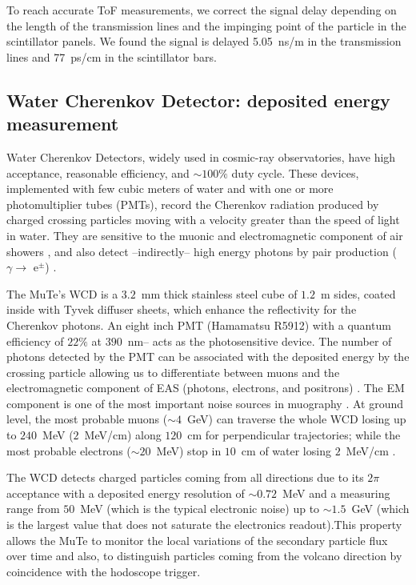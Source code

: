 \documentclass[letterpaper,11pt]{article}
\begin{document}
To reach accurate ToF measurements, we correct the signal delay depending on the length of the transmission lines and the impinging point of the particle in the scintillator panels. We found the signal is delayed 5.05~ns/m in the transmission lines and 77~ps/cm in the scintillator bars.

\subsection{Water Cherenkov Detector: deposited energy measurement}

Water Cherenkov Detectors, widely used in cosmic-ray observatories, have high acceptance, reasonable efficiency, and $\sim 100\%$ duty cycle. These devices, implemented with few cubic meters of water and with one or more photomultiplier tubes (PMTs), record the Cherenkov radiation produced by charged crossing particles moving with a velocity greater than the speed of light in water. They are sensitive to the muonic and electromagnetic component of air showers \cite{Auger2015}, and also detect --indirectly-- high energy photons by pair production ($\gamma \rightarrow$ e$^{\pm}$) \cite{allard2007detecting, allard2008use, allekotte2008surface}. 

The MuTe's WCD is a $3.2$~mm thick stainless steel cube of $1.2$~m sides, coated inside with Tyvek diffuser sheets, which enhance the reflectivity for the Cherenkov photons. An eight inch PMT (Hamamatsu R5912) with a quantum efficiency of $22\%$ at $390$~nm-- acts as the photosensitive device. The number of photons detected by the PMT can be associated with the deposited energy by the crossing particle allowing us to differentiate between muons and the electromagnetic component of EAS (photons, electrons, and positrons) \cite{Billoir2014}. The EM component is one of the most important noise sources in muography \cite{KUSAGAYA2015, Nishiyama2014Noise, Marteau2012Noise}. At ground level, the most probable muons ($\sim 4$~GeV) can traverse the whole WCD losing up to $240$~MeV ($2$~MeV/cm) along $120$~cm for perpendicular trajectories; while the most probable electrons ($\sim 20$~MeV) stop in $10$~cm of water losing $2$~MeV/cm  \cite{groom2001muon,groom2000passage,lohmann1985energy,olive2014passage,Vasquez2018, Motta2018}.

The WCD detects charged particles coming from all directions due to its $2\pi$ acceptance with a deposited energy resolution of $\sim 0.72$~MeV and a measuring range from $50$~MeV (which is the typical electronic noise) up to $\sim 1.5$~GeV (which is the largest value that does not saturate the electronics readout).This property allows the MuTe to monitor the local variations of the secondary particle flux over time \cite{Leon2018} and also, to distinguish particles coming from the volcano direction by coincidence with the hodoscope trigger. 
\end{document}
